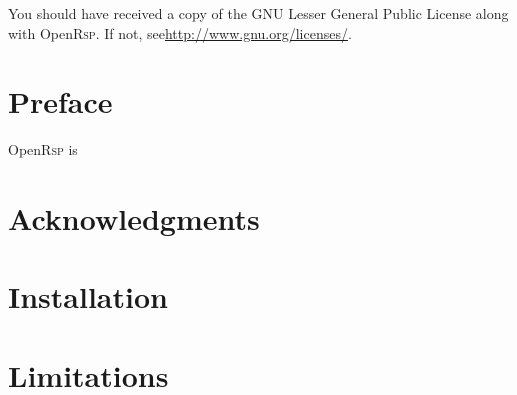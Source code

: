 \documentclass[a4paper,11pt,twoside,openright]{book}
\begin{document}
You should have received a copy of the GNU Lesser General Public License
along with Open\textsc{Rsp}. If not, see\linebreak \url{http://www.gnu.org/licenses/}.
\endgroup
\clearpage

\pagestyle{headings}


\tableofcontents

\chapter*{Preface}
\label{chap:preface}


Open\textsc{Rsp} is 

\chapter*{Acknowledgments}
\label{chap:acknowledgments}


\mainmatter
{}



\chapter{Installation}
\label{chap:installation}

\chapter{Limitations}
\label{chap:limitations}

\backmatter

\begin{small}
  
%  
  
\end{small}

\end{document}
